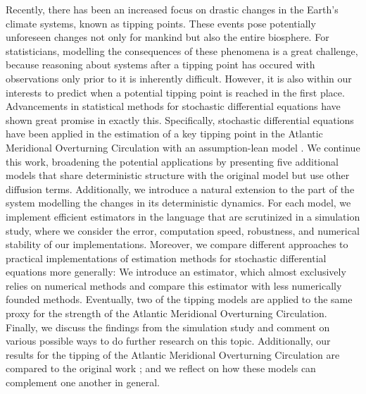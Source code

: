 \noindent Recently, there has been an increased focus on drastic changes in the Earth's climate systems, known as tipping points. These events pose potentially unforeseen changes not only for mankind but also the entire biosphere. For statisticians, modelling the consequences of these phenomena is a great challenge, because reasoning about systems after a tipping point has occured with observations only prior to it is inherently difficult. However, it is also within our interests to predict when a potential tipping point is reached in the first place. Advancements in statistical methods for stochastic differential equations \cite{SplittingSchemes} have shown great promise in exactly this. Specifically, stochastic differential equations have been applied in the estimation of a key tipping point in the Atlantic Meridional Overturning Circulation with an assumption-lean model \cite{Ditlevsen2023}. We continue this work, broadening the potential applications by presenting five additional models that share deterministic structure with the original model but use other diffusion terms. Additionally, we introduce a natural extension to the part of the system modelling the changes in its deterministic dynamics. For each model, we implement efficient estimators in the  language\cite{Rlang} that are scrutinized in a simulation study, where we consider the error, computation speed, robustness, and numerical stability of our implementations. Moreover, we compare different approaches to practical implementations of estimation methods for stochastic differential equations more generally: We introduce an estimator, which almost exclusively relies on numerical methods and compare this estimator with less numerically founded methods. Eventually, two of the tipping models are applied to the same proxy for the strength of the Atlantic Meridional Overturning Circulation. Finally, we discuss the findings from the simulation study and comment on various possible ways to do further research on this topic. Additionally, our results for the tipping of the Atlantic Meridional Overturning Circulation are compared to the original work \cite{Ditlevsen2023}; and we reflect on how these models can complement one another in general.
